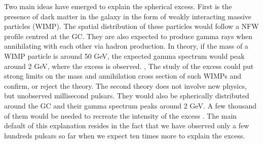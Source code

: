 Two main ideas have emerged to explain the spherical excess.
First is the presence of dark matter in the galaxy in the form of weakly interacting massive particles (WIMP). The spatial distribution of these particles would follow a NFW profile centred at the GC. They are also expected to produce gamma rays when annihilating with each other via hadron production. In theory, if the mass of a WIMP particle is around 50 GeV, the expected gamma spectrum would peak around 2 GeV, where the excess is observed. \cite{Calore2015}, \cite{Fermi2017}
The study of the excess could put strong limits on the mass and annihilation cross section of such WIMPs and confirm, or reject the theory.
The second theory does not involve new physics, but unobserved millisecond pulsars. They would also be spherically distributed around the GC and their gamma spectrum peaks around 2 GeV. A few thousand of them would be needed to recreate the intensity of the excess \cite{Fermi2017}. The main default of this explanation resides in the fact that we have observed only a few hundreds pulsars so far when we expect ten times more to explain the excess.















